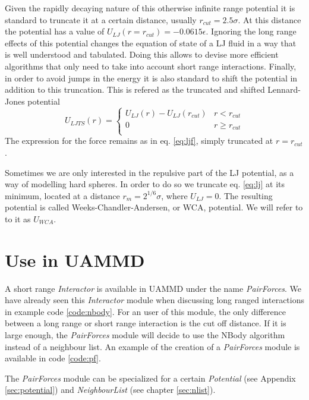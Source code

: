 \documentclass[ twoside,openright,titlepage,numbers=noenddot,%
headinclude,footinclude,cleardoublepage=empty,abstract=on,
BCOR=5mm,paper=a4,fontsize=11pt, dvipsnames
]{scrreprt}
\newcommand{\uammd}{\gls{UAMMD}\xspace}
\begin{document}
Given the rapidly decaying nature of this otherwise infinite range potential it is standard to truncate it at a certain distance, usually $r_{cut} = 2.5\sigma$. At this distance the potential has a value of $U_{LJ}(r = r_{cut}) = -0.0615\epsilon$.
Ignoring the long range effects of this potential changes the equation of state of a \gls{LJ} fluid in a way that is well understood and tabulated\cite{Thol2015}. Doing this allows to devise more efficient algorithms that only need to take into account short range interactions.
Finally, in order to avoid jumps in the energy it is also standard to shift the potential in addition to this truncation. This is refered as the truncated and shifted Lennard-Jones potential
\begin{equation}
  \label{eq:ljts}
  U_{LJTS}(r) =
  \begin{cases}
      U_{LJ}(r) - U_{LJ}(r_{cut}) & r<r_{cut}\\
      0 & r\ge r_{cut}\\                                    
    \end{cases}
\end{equation}
The expression for the force remains as in eq. \eqref{eq:ljf}, simply truncated at $r=r_{cut}$.

Sometimes we are only interested in the repulsive part of the LJ potential, as a way of modelling hard spheres. In order to do so we truncate eq. \eqref{eq:lj} at its minimum, located at a distance $r_m = 2^{1/6}\sigma$, where $U_{LJ} = 0$. The resulting potential is called Weeks-Chandler-Andersen, or WCA, potential. We will refer to to it as $U_{WCA}$.

\section*{Use in UAMMD}

A short range \emph{Interactor} is available in \uammd under the name \emph{PairForces}. We have already seen this \emph{Interactor} module when discussing long ranged interactions in example code \ref{code:nbody}. For an user of this module, the only difference between a long range or short range interaction is the cut off distance. If it is large enough, the \emph{PairForces} module will decide to use the NBody algorithm instead of a neighbour list. An example of the creation of a \emph{PairForces} module is available in code \ref{code:pf}.

The \emph{PairForces} module can be specialized for a certain \emph{Potential} (see Appendix \ref{sec:potential}) and \emph{NeighbourList} (see chapter \ref{sec:nlist}).
\end{document}
